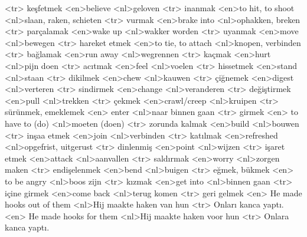 <tr> keşfetmek
<en>believe 
<nl>geloven
<tr> inanmak
<en>to hit, to shoot 
<nl>slaan, raken, schieten
<tr> vurmak
<en>brake into 
<nl>ophakken, breken
<tr> parçalamak
<en>wake up 
<nl>wakker worden
<tr> uyanmak
<en>move 
<nl>bewegen
<tr> hareket etmek
<en>to tie, to attach 
<nl>knopen, verbinden
<tr> bağlamak
<en>run away 
<nl>wegrennen
<tr> kaçmak
<en>hurt 
<nl>pijn doen
<tr> acıtmak
<en>feel 
<nl>voelen
<tr> hissetmek
<en>stand 
<nl>staan
<tr> dikilmek
<en>chew 
<nl>kauwen
<tr> çiğnemek
<en>digest 
<nl>verteren
<tr> sindirmek
<en>change 
<nl>veranderen
<tr> değiştirmek
<en>pull 
<nl>trekken
<tr> çekmek
<en>crawl/creep 
<nl>kruipen
<tr> sürünmek, emeklemek
<en> enter 
<nl>naar binnen gaan 
<tr> girmek 
<en> to have to (do) 
<nl>moeten (doen) 
<tr> zorunda kalmak
<en>build 
<nl>bouwen
<tr> inşaa etmek
<en>join 
<nl>verbinden
<tr> katılmak
<en>refreshed 
<nl>opgefrist, uitgerust
<tr> dinlenmiş
<en>point 
<nl>wijzen
<tr> işaret etmek
<en>attack 
<nl>aanvallen
<tr> saldırmak
<en>worry 
<nl>zorgen maken
<tr> endişelenmek
<en>bend 
<nl>buigen
<tr> eğmek, bükmek
<en> to be angry 
<nl>boos zijn
<tr> kızmak
<en>get into 
<nl>binnen gaan
<tr> içine girmek
<en>come back 
<nl>terug komen
<tr> geri gelmek
<en> He made hooks out of them 
<nl>Hij maakte haken van hun 
<tr> Onları kanca yaptı.
<en> He made hooks for them 
<nl>Hij maakte haken voor hun 
<tr> Onlara kanca yaptı.

